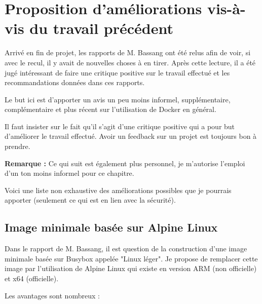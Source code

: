 \documentclass[11pt,a4paper,oneside]{report}
\begin{document}
\chapter{Proposition d'améliorations vis-à-vis du travail précédent}
Arrivé en fin de projet, les rapports de M. Bassang ont été relus afin de voir, si avec le recul, il y avait de nouvelles choses à en tirer. Après cette lecture, il a été jugé intéressant de faire une critique positive sur le travail effectué et les recommandations données dans ces rapports.

Le but ici est d'apporter un avis un peu moins informel, supplémentaire, complémentaire et plus récent sur l'utilisation de Docker en général.

Il faut insister sur le fait qu'il s'agit d'une critique positive qui a pour but d'améliorer le travail effectué. Avoir un feedback sur un projet est toujours bon à prendre.

\textbf{Remarque :} Ce qui suit est également plus personnel, je m'autorise l'emploi d'un ton moins informel pour ce chapitre.

Voici une liste non exhaustive des améliorations possibles que je pourrais apporter (seulement ce qui est en lien avec la sécurité).

\section{Image minimale basée sur Alpine Linux}
Dans le rapport de M. Bassang, il est question de la construction d'une image minimale basée sur Busybox appelée "Linux léger". Je propose de remplacer cette image par l'utilisation de Alpine Linux qui existe en version ARM (non officielle) et x64 (officielle).

Les avantages sont nombreux :
\end{document}

